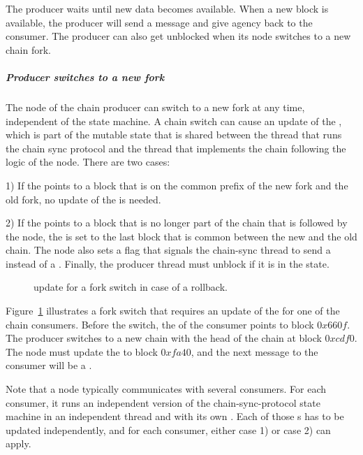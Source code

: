 The producer waits until new data becomes available.
When a new block is available, the producer will
send a \MsgRollForward{} message and give agency back to the consumer.
The producer can also get unblocked when its node switches to a new chain fork.

\subparagraph{Producer switches to a new fork}
The node of the chain producer can switch to a new fork at any time, independent of the
state machine.
A chain switch can cause an update of the \readpointer{},
which is part of the mutable state that is shared between the thread that runs
the chain sync protocol and the thread that implements the chain following the logic of the node.
There are two cases:

1) If the \readpointer{} points to a block that is on the common prefix of the new
fork and the old fork, no update of the \readpointer{} is needed.

2) If the \readpointer{} points to a block that is no longer part of the chain that is followed by the node,
the \readpointer{} is set to the last block that is common between the new and the old chain.
The node also sets a flag that signals the chain-sync thread to send a \MsgRollBackward{} instead
of a \MsgRollForward.
Finally, the producer thread must unblock if it is in the \StMustReply{} state.

\begin{figure}[ht]
\begin{center}
\end{center}
\caption{\readpointer{} update for a fork switch in case of a rollback.}
\label{read-pointer-rollback}
\end{figure}

Figure~\ref{read-pointer-rollback} illustrates a fork switch that requires an update of the \readpointer{}
for one of the chain consumers.
Before the switch, the \readpointer{} of the consumer points to block $0x660f$.
The producer switches to a new chain with the head of the chain at block $0xcdf0$.
The node must update the \readpointer{} to block $0xfa40$, and the next message to the consumer
will be a \MsgRollBackward.

Note that a node typically communicates with several consumers. For each consumer, it runs an independent
version of the chain-sync-protocol state machine in an independent thread and with its own \readpointer{}.
Each of those \readpointer{}s has to be updated independently, and for each consumer,
either case 1) or case 2) can apply.

